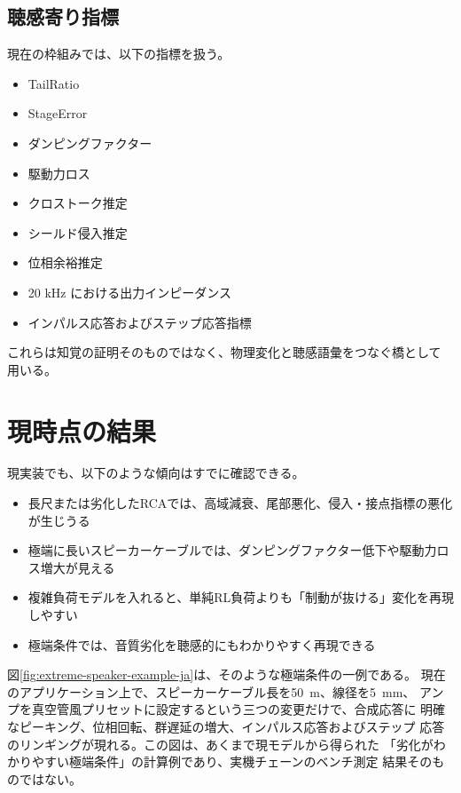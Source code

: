 \documentclass[a4paper,11pt]{ltjsarticle}
\begin{document}
\subsection{聴感寄り指標}

現在の枠組みでは、以下の指標を扱う。

\begin{itemize}
  \item TailRatio
  \item StageError
  \item ダンピングファクター
  \item 駆動力ロス
  \item クロストーク推定
  \item シールド侵入推定
  \item 位相余裕推定
  \item 20 kHz における出力インピーダンス
  \item インパルス応答およびステップ応答指標
\end{itemize}

これらは知覚の証明そのものではなく、物理変化と聴感語彙をつなぐ橋として
用いる。

\section{現時点の結果}

現実装でも、以下のような傾向はすでに確認できる。

\begin{itemize}
  \item 長尺または劣化したRCAでは、高域減衰、尾部悪化、侵入・接点指標の悪化が生じうる
  \item 極端に長いスピーカーケーブルでは、ダンピングファクター低下や駆動力ロス増大が見える
  \item 複雑負荷モデルを入れると、単純RL負荷よりも「制動が抜ける」変化を再現しやすい
  \item 極端条件では、音質劣化を聴感的にもわかりやすく再現できる
\end{itemize}

図\ref{fig:extreme-speaker-example-ja}は、そのような極端条件の一例である。
現在のアプリケーション上で、スピーカーケーブル長を50~m、線径を5~mm、
アンプを真空管風プリセットに設定するという三つの変更だけで、合成応答に
明確なピーキング、位相回転、群遅延の増大、インパルス応答およびステップ
応答のリンギングが現れる。この図は、あくまで現モデルから得られた
「劣化がわかりやすい極端条件」の計算例であり、実機チェーンのベンチ測定
結果そのものではない。
\end{document}

